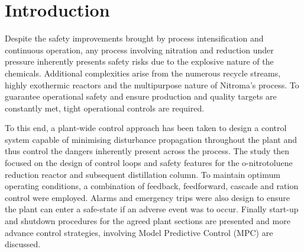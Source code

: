 \section{Introduction}%

Despite the safety improvements brought by process intensification and continuous operation, any process involving nitration and reduction under pressure inherently presents safety risks due to the explosive nature of the chemicals. Additional complexities arise from the numerous recycle streams, highly exothermic reactors and the multipurpose nature of Nitroma's process. To guarantee operational safety and ensure production and quality targets are constantly met, tight operational controls are required.  

To this end, a plant-wide control approach has been taken to design a control system capable of minimising disturbance propagation throughout the plant and thus control the dangers inherently present across the process. The study then focused on the design of control loops and safety features for the o-nitrotoluene reduction reactor and subsequent distillation column. To maintain optimum operating conditions, a combination of feedback, feedforward, cascade and ration control were employed. Alarms and emergency trips were also design to ensure the plant can enter a safe-state if an adverse event was to occur. Finally start-up and shutdown procedures for the agreed plant sections are presented and more advance control strategies, involving Model Predictive Control (MPC) are discussed.



